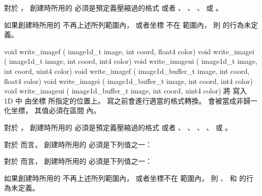 對於 ，
創建時所用的  必須是預定義壓縮過的格式
或者 、 、 、
  或 。

如果創建時所用的  不再上述所列範圍內，
或者坐標  不在 
範圍內，
則  的行為未定義。
\stopbuffer

void write_imagef (
	image1d_t image,
	int coord,
	float4 color)
void write_imagei (
	image1d_t image,
	int coord,
	int4 color)
void write_imageui (
	image1d_t image,
	int coord,
	uint4 color)
void write_imagef (
	image1d_buffer_t image,
	int coord,
	float4 color)
void write_imagei (
	image1d_buffer_t image,
	int coord,
	int4 color)
void write_imageui (
	image1d_buffer_t image,
	int coord,
	uint4 color)
\stopbuffer
{}
將  寫入 1D   中
由坐標  所指定的位置上。
寫之前會進行適當的格式轉換。
 會被當成非歸一化坐標，
其值必須在區間  內。

對於 ，
創建時所用的  必須是預定義壓縮過的格式
或者 、 、 、
 、  或 。

對於  而言，
創建時所用的  必須是下列值之一：
\startigBase
\item {}
\item {}
\item {}
\stopigBase

對於  而言，
創建時所用的  必須是下列值之一：
\startigBase
\item {}
\item {}
\item {}
\stopigBase

如果創建時所用的  不再上述所列範圍內，
或者坐標不在  範圍內，
則 、  和  的行為未定義。
\stopbuffer

